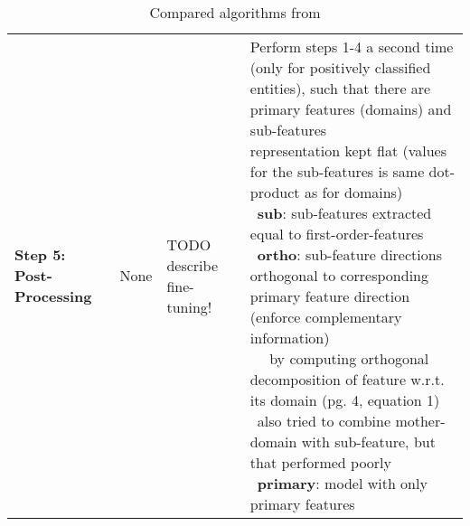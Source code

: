 \begin{landscape}
\begin{table}[]
{\begin{tabular}{llll}
			\\  \midrule
			\textbf{Step 5: Post-Processing} &                   
			None &                 
			TODO describe fine-tuning! & \specialcell[l]{
			Perform steps 1-4 a second time (only for positively classified entities), such that there are primary features (domains) and sub-features \\ representation kept flat (values for the sub-features is same dot-product as for domains) \\ \textbullet\, \textbf{sub}: sub-features extracted equal to first-order-features \\ \textbullet\, \textbf{ortho}: sub-feature directions orthogonal to corresponding primary feature direction (enforce complementary information) \\ ~~ by computing orthogonal decomposition of feature w.r.t. its domain (pg. 4, equation 1) \\ \textbullet\, also tried to combine mother-domain with sub-feature, but that performed poorly \\ \textbullet\, \textbf{primary}: model with only primary features}
			\end{tabular}
		}
		\caption{Compared algorithms from \cite{Derrac2015} \cite{Ager2018} \cite{Alshaikh2020}}
		\label{tab:compared_algos}
	\end{table}
\end{landscape}


